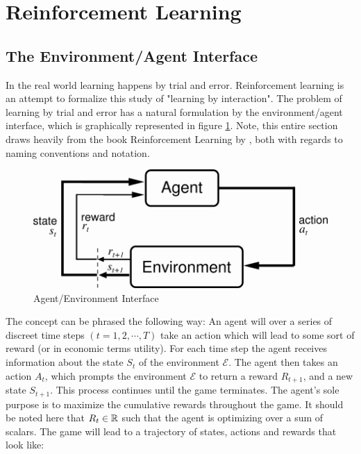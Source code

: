 \section{Reinforcement Learning}
\label{sec:rl_theory}

\subsection{The Environment/Agent Interface}

In the real world learning happens by trial and error. Reinforcement learning is an attempt to formalize this study of "learning by interaction". The problem of learning by trial and error has a natural formulation by the environment/agent interface, which is graphically represented in figure \ref{fig:agent_enviroment_interface}. Note, this entire section draws heavily from the book Reinforcement Learning by \textcite{sutton_reinforcement_2018}, both with regards to naming conventions and notation.

\begin{figure}
    \centering
    \includegraphics[scale=0.35]{figures/agent_environment_interface.png}
    \caption{Agent/Environment Interface}
    \label{fig:agent_enviroment_interface}
\end{figure}

The concept can be phrased the following way: An agent will over a series of discreet time steps $(t=1, 2, \cdots, T)$ take an action which will lead to some sort of reward (or in economic terms utility). For each time step the agent receives information about the state $S_t$ of the environment $\mathcal{E}$. The agent then takes an action $A_t$, which prompts the environment $\mathcal{E}$  to return a reward $R_{t+1}$, and a new state $S_{t+1}$. This process continues until the game terminates. The agent's sole purpose is to maximize the cumulative rewards throughout the game. It should be noted here that $R_t \in \mathbb{R}$ such that the agent is optimizing over a sum of scalars. The game will lead to a trajectory of states, actions and rewards that look like:

